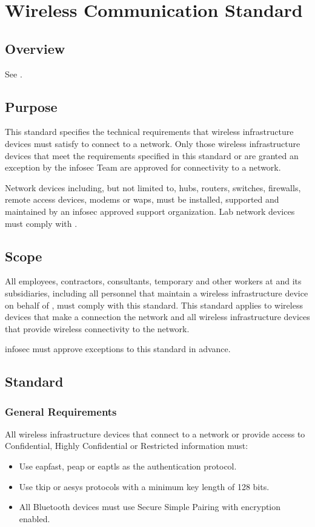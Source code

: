 \chapter{Wireless Communication Standard}\label{NS:WCS}
\CommonIntroduction
\section{Overview}
See .
\section{Purpose}\label{NS:WCS:Pu}
This standard specifies the technical requirements that wireless infrastructure devices must satisfy to connect to a \CompanyName{} network.  
Only those wireless infrastructure devices that meet the requirements specified in this standard or are granted an exception by the \gls{infosec} Team are approved for connectivity to a \CompanyName{} network.

Network devices including, but not limited to, hubs, routers, switches, firewalls, remote access devices, modems\oxford{} or \glspl{wap}, must be installed, supported\oxford{} and maintained by an \gls{infosec} approved support organization.  
Lab network devices must comply with .
\section{Scope}
All employees, contractors, consultants, temporary\oxford{} and other workers at \CompanyName{} and its subsidiaries, including all personnel that maintain a wireless infrastructure device on behalf of \CompanyName{}, must comply with this standard.  
This standard applies to wireless devices that make a connection the network and all wireless infrastructure devices that provide wireless connectivity to the network.

\gls{infosec} must approve exceptions to this standard in advance. 
\section{Standard}
\subsection{General Requirements}
All wireless infrastructure devices that connect to a \CompanyName{} network or provide access to \CompanyName{} Confidential, \CompanyName{} Highly Confidential\oxford{} or \CompanyName{} Restricted information must:
\begin{itemize}
\item
Use \gls{eapfast}, \gls{peap}\oxford{} or \gls{eaptls} as the authentication protocol.
\item
Use \gls{tkip} or \gls{aesys} protocols with a minimum key length of 128 bits.
\item
All Bluetooth devices must use Secure Simple Pairing with encryption enabled.
\end{itemize}
